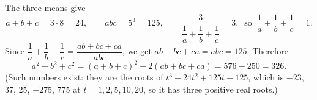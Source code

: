 The three means give
\[a+b+c=3\cdot8=24,\qquad abc=5^3=125,\qquad \dfrac{3}{\dfrac{1}{a}+\dfrac{1}{b}+\dfrac{1}{c}}=3,\ \text{ so }\ \dfrac{1}{a}+\dfrac{1}{b}+\dfrac{1}{c}=1 .\]
Since $\dfrac{1}{a}+\dfrac{1}{b}+\dfrac{1}{c}=\dfrac{ab+bc+ca}{abc}$, we get $ab+bc+ca=abc=125$. Therefore
\[a^2+b^2+c^2=(a+b+c)^2-2(ab+bc+ca)=576-250=\boxed{326}.\]
(Such numbers exist: they are the roots of $t^3-24t^2+125t-125$, which is $-23$, $37$, $25$, $-275$, $775$ at $t=1,2,5,10,20$, so it has three positive real roots.)

